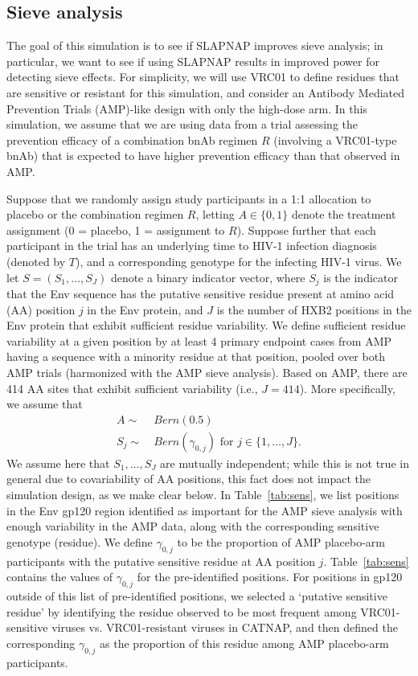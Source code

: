 \documentclass[10pt]{article}
\begin{document}
\subsection{Sieve analysis}

The goal of this simulation is to see if SLAPNAP improves sieve analysis; in particular, we want to see if using SLAPNAP results in improved power for detecting sieve effects. For simplicity, we will use VRC01 to define residues that are sensitive or resistant for this simulation, and consider an Antibody Mediated Prevention Trials (AMP)-like design with only the high-dose arm. In this simulation, we assume that we are using data from a trial assessing the prevention efficacy of a combination bnAb regimen $R$ (involving a VRC01-type bnAb) that is expected to have higher prevention efficacy than that observed in AMP.

Suppose that we randomly assign study participants in a 1:1 allocation to placebo or the combination regimen $R$, letting $A \in \{0,1\}$ denote the treatment assignment (0 = placebo, 1 = assignment to $R$). Suppose further that each participant in the trial has an underlying time to HIV-1 infection diagnosis (denoted by $T$), and a corresponding genotype for the infecting HIV-1 virus. We let $S = (S_1, \ldots, S_J)$ denote a binary indicator vector, where $S_j$ is the indicator that the Env sequence has the putative sensitive residue present at amino acid (AA) position $j$ in the Env protein, and $J$ is the number of HXB2 positions in the Env protein that exhibit sufficient residue variability. We define sufficient residue variability at a given position by at least 4 primary endpoint cases from AMP having a sequence with a minority residue at that position, pooled over both AMP trials (harmonized with the AMP sieve analysis). Based on AMP, there are 414 AA sites that exhibit sufficient variability (i.e., $J = 414$). More specifically, we assume that
\begin{align*}
  A \sim & \ Bern(0.5) \\
  S_j \sim & \ Bern(\gamma_{0,j}) \text{ for } j \in \{1, \ldots, J\}.
\end{align*}
We assume here that $S_1, \ldots, S_J$ are mutually independent; while this is not true in general due to covariability of AA positions, this fact does not impact the simulation design, as we make clear below. In Table~\ref{tab:sens}, we list positions in the Env gp120 region identified as important for the AMP sieve analysis with enough variability in the AMP data, along with the corresponding sensitive genotype (residue). We define $\gamma_{0,j}$ to be the proportion of AMP placebo-arm participants with the putative sensitive residue at AA position $j$. Table~\ref{tab:sens} contains the values of $\gamma_{0,j}$ for the pre-identified positions. For positions in gp120 outside of this list of pre-identified positions, we selected a `putative sensitive residue' by identifying the residue observed to be most frequent among VRC01-sensitive viruses vs. VRC01-resistant viruses in CATNAP, and then defined the corresponding $\gamma_{0,j}$ as the proportion of this residue among AMP placebo-arm participants.
\end{document}
